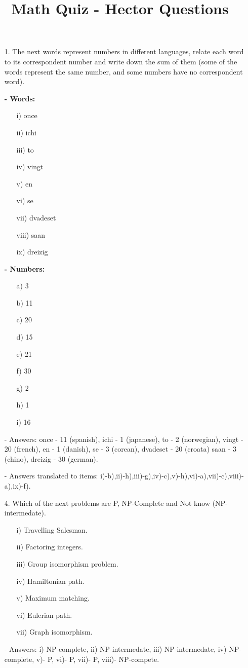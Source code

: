 \documentclass[12pt,spanish]{article}
\title{Math Quiz - Hector Questions}
\begin{document}
\maketitle 

\begin{enumerate}
\item[1.] The next words represent numbers in different languages, relate each word to its correspondent number and write down the sum of them (some of the words represent the same number, and some numbers have no correspondent word).

\textbf{- Words:}
\begin{enumerate}
\item[i)] once
\item[ii)] ichi
\item[iii)] to
\item[iv)] vingt
\item[v)] en
\item[vi)] se
\item[vii)] dvadeset
\item[viii)] saan
\item[ix)] dreizig
\end{enumerate}
\textbf{- Numbers:}
\begin{enumerate}
\item[a)] 3
\item[b)] 11
\item[c)] 20
\item[d)] 15
\item[e)] 21
\item[f)] 30
\item[g)] 2
\item[h)] 1
\item[i)] 16
\end{enumerate}
- Answers: once - 11 (spanish),  ichi - 1 (japanese), to - 2 (norwegian), vingt - 20 (french), en - 1 (danish), se - 3 (corean), dvadeset - 20 (croata) saan - 3 (chino), dreizig - 30 (german).

- Answers translated to items: i)-b),ii)-h),iii)-g),iv)-c),v)-h),vi)-a),vii)-c),viii)-a),ix)-f).

\item[4.] Which of the next problems are P, NP-Complete and Not know (NP-intermedate). 
\begin{enumerate}
\item[i)] Travelling Salesman.
\item[ii)] Factoring integers.
\item[iii)] Group isomorphism problem.
\item[iv)] Hamiltonian path.
\item[v)] Maximum matching.
\item[vi)] Eulerian path.
\item[vii)] Graph isomorphism.
\end{enumerate}
- Answers: i) NP-complete, ii) NP-intermedate, iii) NP-intermedate, iv) NP-complete, v)- P, vi)- P, vii)- P, viii)- NP-compete.


\end{enumerate}
\end{document}
